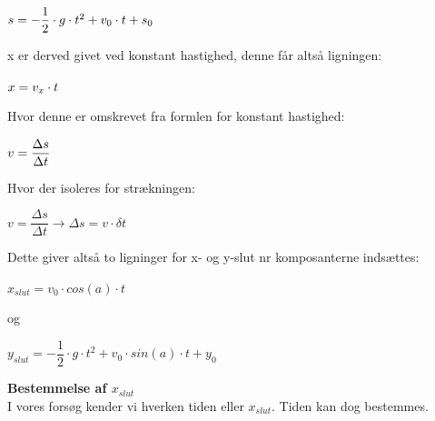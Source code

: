 \begin{center}
\begin{math}
\centering
s = -\dfrac{1}{2} \cdot g \cdot t^{2} + v_{0} \cdot t + s_{0} 
\end{math}
\end{center}

x er derved givet ved konstant hastighed, denne får altså ligningen:\\

\begin{center}
\begin{math}
\centering
x = v_{x} \cdot t
\end{math}
\end{center}

Hvor denne er omskrevet fra formlen for konstant hastighed:\\

\begin{center}
\begin{math}
\centering
v = \dfrac{\Delta s}{\Delta t}
\end{math}
\end{center}




Hvor der isoleres for strækningen:\\

\begin{center}
\begin{math}
v = \dfrac{\Delta s}{\Delta t} \longrightarrow \Delta s = v \cdot \delta t
\end{math}
\end{center}

Dette giver altså to ligninger for x- og y-slut nr komposanterne indsættes:\\

\begin{center}
\begin{math}
x_{slut} = v_{0} \cdot cos(a) \cdot t
\end{math}
\end{center}

og\\

\begin{center}
\begin{math}
y_{slut} = -\dfrac{1}{2} \cdot g \cdot t^{2} + v_{0} \cdot sin(a) \cdot t + y_{0}
\end{math}
\end{center}

\textbf{Bestemmelse af  $x_{slut}$}\\
I vores forsøg kender vi hverken tiden eller $x_{slut}$. Tiden kan dog bestemmes.\\

